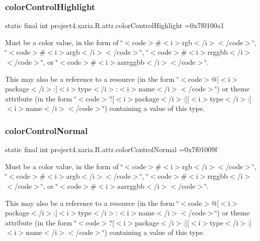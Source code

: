 \subsubsection{\texorpdfstring{color\+Control\+Highlight}{colorControlHighlight}}
{\footnotesize\ttfamily static final int project4.\+xaria.\+R.\+attr.\+color\+Control\+Highlight =0x7f0100a1\hspace{0.3cm}{\ttfamily [static]}}

Must be a color value, in the form of \char`\"{}$<$code$>$\#$<$i$>$rgb$<$/i$>$$<$/code$>$\char`\"{}, \char`\"{}$<$code$>$\#$<$i$>$argb$<$/i$>$$<$/code$>$\char`\"{}, \char`\"{}$<$code$>$\#$<$i$>$rrggbb$<$/i$>$$<$/code$>$\char`\"{}, or \char`\"{}$<$code$>$\#$<$i$>$aarrggbb$<$/i$>$$<$/code$>$\char`\"{}. 

This may also be a reference to a resource (in the form \char`\"{}$<$code$>$@\mbox{[}$<$i$>$package$<$/i$>$\+:\mbox{]}$<$i$>$type$<$/i$>$\+:$<$i$>$name$<$/i$>$$<$/code$>$\char`\"{}) or theme attribute (in the form \char`\"{}$<$code$>$?\mbox{[}$<$i$>$package$<$/i$>$\+:\mbox{]}\mbox{[}$<$i$>$type$<$/i$>$\+:\mbox{]}$<$i$>$name$<$/i$>$$<$/code$>$\char`\"{}) containing a value of this type. \mbox{\label{classproject4_1_1xaria_1_1R_1_1attr_a2f87384f7f67b60a59855f33e7d01f7d}} 
\subsubsection{\texorpdfstring{color\+Control\+Normal}{colorControlNormal}}
{\footnotesize\ttfamily static final int project4.\+xaria.\+R.\+attr.\+color\+Control\+Normal =0x7f01009f\hspace{0.3cm}{\ttfamily [static]}}

Must be a color value, in the form of \char`\"{}$<$code$>$\#$<$i$>$rgb$<$/i$>$$<$/code$>$\char`\"{}, \char`\"{}$<$code$>$\#$<$i$>$argb$<$/i$>$$<$/code$>$\char`\"{}, \char`\"{}$<$code$>$\#$<$i$>$rrggbb$<$/i$>$$<$/code$>$\char`\"{}, or \char`\"{}$<$code$>$\#$<$i$>$aarrggbb$<$/i$>$$<$/code$>$\char`\"{}. 

This may also be a reference to a resource (in the form \char`\"{}$<$code$>$@\mbox{[}$<$i$>$package$<$/i$>$\+:\mbox{]}$<$i$>$type$<$/i$>$\+:$<$i$>$name$<$/i$>$$<$/code$>$\char`\"{}) or theme attribute (in the form \char`\"{}$<$code$>$?\mbox{[}$<$i$>$package$<$/i$>$\+:\mbox{]}\mbox{[}$<$i$>$type$<$/i$>$\+:\mbox{]}$<$i$>$name$<$/i$>$$<$/code$>$\char`\"{}) containing a value of this type. \mbox{\label{classproject4_1_1xaria_1_1R_1_1attr_ad7e37376d096d284e0265f52ca751c43}} 
